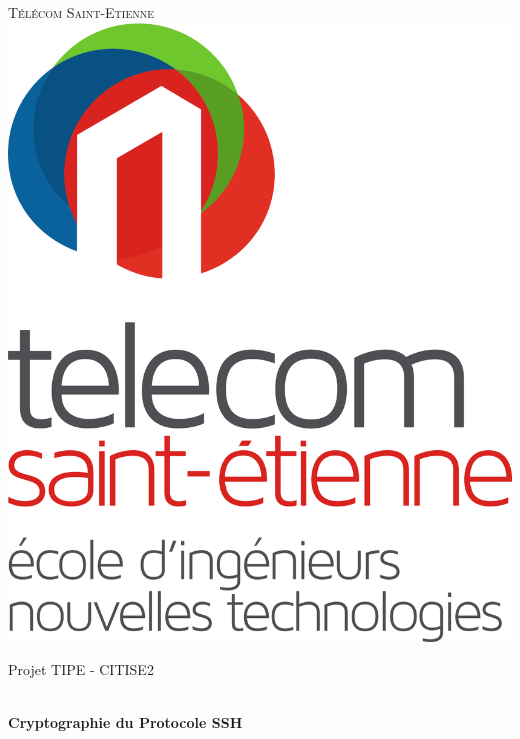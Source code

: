 \begin{titlepage}

    \begin{center}

        \textsc{\LARGE Télécom Saint-Etienne} \\[1cm]
        
        \includegraphics[scale=0.12]{images/logo_telecom.png}

        \hfill
        \vfill

    

        {\Large Projet TIPE - CITISE2}
        
        \HRule \\[0.4cm]
        { \huge \bfseries Cryptographie du Protocole SSH}\\[0.4cm] %
        \HRule \\[1.5cm]
         

\end{center}
\end{titlepage}
